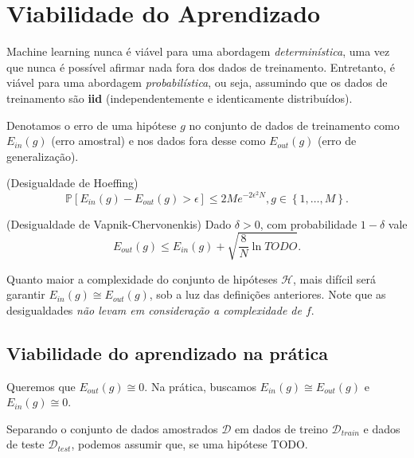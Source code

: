 \section*{Viabilidade do Aprendizado}

Machine learning nunca é viável para uma abordagem \emph{determinística}, uma vez que nunca é possível afirmar nada fora dos dados de treinamento. Entretanto, é viável para uma abordagem \emph{probabilística}, ou seja, assumindo que os dados de treinamento são \textbf{iid} (independentemente e identicamente distribuídos).

Denotamos o erro de uma hipótese $g$ no conjunto de dados de treinamento como $E_{in}\left( g \right)$ (erro amostral) e nos dados fora desse como $E_{out}\left( g \right)$ (erro de generalização).

\begin{definition}
    (Desigualdade de Hoeffing) \[
	\mathbb{P}\left[ E_{in}(g) - E_{out}\left( g \right) >\epsilon \right] \le 2 M e^{-2\epsilon^2N}, g \in \left\{ 1,\ldots,M \right\} 
    .\] 

    (Desigualdade de Vapnik-Chervonenkis) Dado $\delta>0$, com probabilidade  $1-\delta$ vale  \[
    E_{out}\left( g \right) \le E_{in}\left( g \right) + \sqrt{\frac{8}{N}\ln TODO} 
    .\] 
\end{definition}

Quanto maior a complexidade do conjunto de hipóteses $\mathcal{H}$, mais difícil será garantir $E_{in}\left( g \right) \cong E_{out}\left( g \right) $, sob a luz das definições anteriores. Note que as desigualdades \emph{não levam em consideração a complexidade de $f$}.

\subsection*{Viabilidade do aprendizado na prática}

Queremos que $E_{out}\left( g \right) \cong 0$. Na prática, buscamos $E_{in}\left( g \right) \cong E_{out}\left( g \right)$ e $E_{in}\left( g \right) \cong 0$.

Separando o conjunto de dados amostrados $\mathcal{D}$ em dados de treino $\mathcal{D}_{train}$ e dados de teste $\mathcal{D}_{test}$, podemos assumir que, se uma hipótese TODO.


